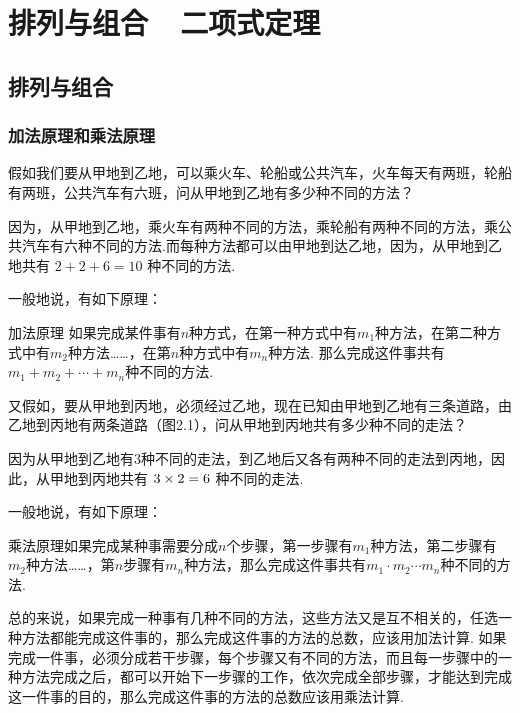 \chapter{排列与组合~~二项式定理}
\section{排列与组合}
\subsection{加法原理和乘法原理}
假如我们要从甲地到乙地，可以乘火车、轮船或公共汽车，火车每天有两班，轮船有两班，公共汽车有六班，问从甲地到乙地有多少种不同的方法？

因为，从甲地到乙地，乘火车有两种不同的方法，乘轮船有两种不同的方法，乘公共汽车有六种不同的方法.而每种方法都可以由甲地到达乙地，因为，从甲地到乙地共有
$2+2+6=10$
种不同的方法.

一般地说，有如下原理：
\begin{blk}{加法原理}
如果完成某件事有$n$种方式，在第一种方式中有$m_1$种方法，在第二种方式中有$m_2$种方法……，在第$n$种方式中有$m_n$种方法. 那么完成这件事共有$m_1+m_2+\cdots+m_n$种不同的方法.
\end{blk}

又假如，要从甲地到丙地，必须经过乙地，现在已知由甲地到乙地有三条道路，由乙地到丙地有两条道路（图2.1），问从甲地到丙地共有多少种不同的走法？
\begin{figure}[htp]
    \centering
{}
    \caption{}
\end{figure}

因为从甲地到乙地有3种不同的走法，到乙地后又各有两种不同的走法到丙地，因此，从甲地到丙地共有
$3\times2=6$
种不同的走法.

一般地说，有如下原理：

\begin{blk}
    {乘法原理}如果完成某种事需要分成$n$个步骤，第一步骤有$m_1$种方法，第二步骤有$m_2$种方法……，第$n$步骤有$m_n$种方法，那么完成这件事共有$m_1\cdot m_2\cdots m_n$种不同的方法.
\end{blk}

总的来说，如果完成一种事有几种不同的方法，这些方法又是互不相关的，任选一种方法都能完成这件事的，那么完成这件事的方法的总数，应该用加法计算. 如果完成一件事，必须分成若干步骤，每个步骤又有不同的方法，而且每一步骤中的一种方法完成之后，都可以开始下一步骤的工作，依次完成全部步骤，才能达到完成这一件事的目的，那么完成这件事的方法的总数应该用乘法计算.

